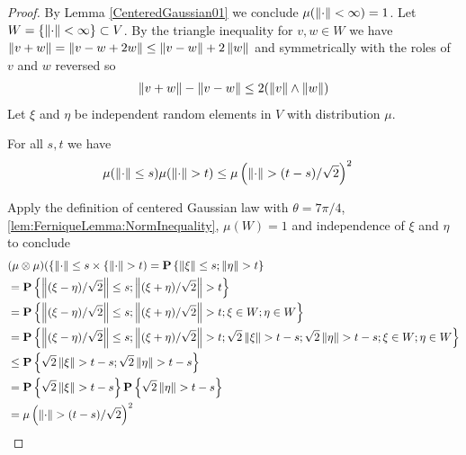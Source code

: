 \begin{proof}
By Lemma \ref{CenteredGaussian01} we conclude $\mu(\left \lVert \cdot \right \rVert < \infty) =1$.  
Let $W = \lbrace \left \lVert \cdot \right \rVert < \infty \rbrace \subset V$.  By the triangle inequality for $v,w \in W$ we have $\left \lVert v+w \right \rVert = \left \lVert v-w + 2w \right \rVert \leq \left \lVert v-w \right \rVert + 2 \left \lVert w \right \rVert$ and symmetrically with the roles of $v$ and $w$ reversed so 
\begin{align}\label{lem:FerniqueLemma:NormInequality}
\left \lVert v+w \right \rVert - \left \lVert v-w \right \rVert \leq 2(\left \lVert v \right \rVert \wedge \left \lVert w \right \rVert)
\end{align}
Let $\xi$ and $\eta$ be independent random elements in $V$ with distribution $\mu$.  
\begin{clm}For all $s,t$ we have 
\begin{align*}
\mu(\left \lVert \cdot \right \rVert \leq s)\mu(\left \lVert \cdot \right \rVert > t)
&\leq\mu \left( \left \lVert \cdot \right \rVert > (t-s)/\sqrt{2}\right)^2
\end{align*}
\end{clm}
Apply the definition of centered Gaussian law with $\theta = 7\pi/4$, \eqref{lem:FerniqueLemma:NormInequality}, $\mu(W)=1$ and independence of $\xi$ and $\eta$ to conclude 
\begin{align*}
&(\mu \otimes \mu)(\lbrace \left \lVert \cdot \right \rVert \leq s \times \lbrace \left \lVert \cdot \right \rVert > t) 
=\textbf{P}\left \{\left \lVert \xi \right \rVert \leq s; \left \lVert \eta \right \rVert > t \right \} \\
&=\textbf{P}\left \{\left \lVert (\xi-\eta)/\sqrt{2} \right \rVert \leq s; \left \lVert (\xi+\eta)/\sqrt{2} \right \rVert > t \right \} \\
&=\textbf{P}\left \{\left \lVert (\xi-\eta)/\sqrt{2} \right \rVert \leq s; \left \lVert (\xi+\eta)/\sqrt{2} \right \rVert > t; \xi \in W; \eta \in W \right \} \\
&=\textbf{P}\left \{\left \lVert (\xi-\eta)/\sqrt{2} \right \rVert \leq s; \left \lVert (\xi+\eta)/\sqrt{2} \right \rVert > t; \sqrt{2} \left \lVert \xi \right \rVert > t-s; \sqrt{2} \left \lVert \eta \right \rVert > t-s; \xi \in W; \eta \in W \right \} \\
&\leq \textbf{P}\left \{\sqrt{2} \left \lVert \xi \right \rVert > t-s; \sqrt{2} \left \lVert \eta \right \rVert > t-s \right \} \\
&=\textbf{P}\left \{\sqrt{2} \left \lVert \xi \right \rVert > t-s \right \} \textbf{P}\left \{ \sqrt{2} \left \lVert \eta \right \rVert > t-s \right \} \\
&=\mu \left( \left \lVert \cdot \right \rVert > (t-s)/\sqrt{2}\right)^2
\end{align*}


\end{proof}
